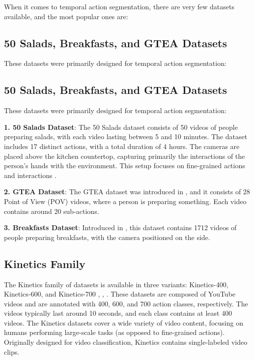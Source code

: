When it comes to temporal action segmentation, there are very few datasets available, and the most popular ones are:

\subsection*{50 Salads, Breakfasts, and GTEA Datasets}
These datasets were primarily designed for temporal action segmentation:

\subsection*{50 Salads, Breakfasts, and GTEA Datasets}
These datasets were primarily designed for temporal action segmentation:

\textbf{1. 50 Salads Dataset}: The 50 Salads dataset consists of 50 videos of people preparing salads, with each video lasting between 5 and 10 minutes. The dataset includes 17 distinct actions, with a total duration of 4 hours. The cameras are placed above the kitchen countertop, capturing primarily the interactions of the person's hands with the environment. This setup focuses on fine-grained actions and interactions \cite{50salads-dataset}.

\textbf{2. GTEA Dataset}: The GTEA dataset was introduced in \cite{gtea-dataset}, and it consists of 28 Point of View (POV) videos, where a person is preparing something. Each video contains around 20 sub-actions.

\textbf{3. Breakfasts Dataset}: Introduced in \cite{breakfast-dataset}, this dataset contains 1712 videos of people preparing breakfasts, with the camera positioned on the side.

\subsection*{Kinetics Family}
The Kinetics family of datasets is available in three variants: Kinetics-400, Kinetics-600, and Kinetics-700 \cite{kinetics-400-dataset}, \cite{kinetics-600-dataset}, \cite{kinetics-700-dataset}. These datasets are composed of YouTube videos and are annotated with 400, 600, and 700 action classes, respectively. The videos typically last around 10 seconds, and each class contains at least 400 videos. The Kinetics datasets cover a wide variety of video content, focusing on humans performing large-scale tasks (as opposed to fine-grained actions). Originally designed for video classification, Kinetics contains single-labeled video clips.

